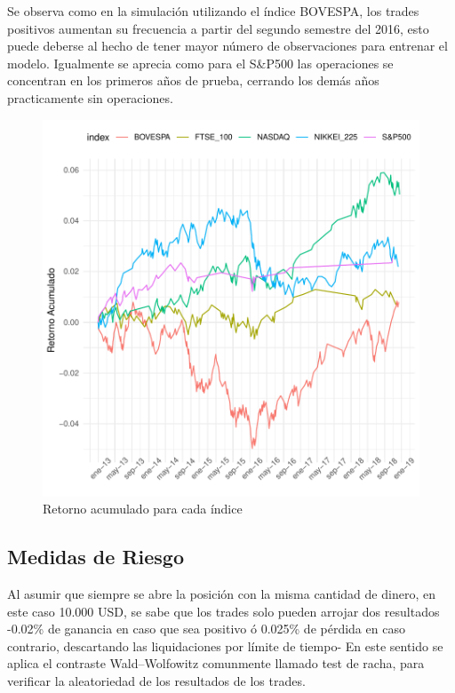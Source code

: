 \documentclass[a4paper,12pt]{Latex/Classes/PhDthesisPSnPDF}
\begin{document}
Se observa como en la simulación utilizando el índice BOVESPA, los trades positivos aumentan su frecuencia a partir del segundo semestre del 2016, esto puede deberse al hecho de tener mayor número de observaciones para entrenar el modelo. Igualmente se aprecia como para el S\&P500 las operaciones se concentran en los primeros años de prueba, cerrando los demás años practicamente sin operaciones.


\begin{figure}[H]
\centering
\includegraphics{main-031}
\caption{Retorno acumulado para cada índice}
\end{figure}

\subsection{Medidas de Riesgo}

Al asumir que siempre se abre la posición con la misma cantidad de dinero, en este caso 10.000 USD, se sabe que los trades solo pueden arrojar dos resultados -0.02\% de ganancia en caso que sea positivo ó 0.025\% de pérdida en caso contrario, descartando las liquidaciones por límite de tiempo- En este sentido se aplica el contraste Wald–Wolfowitz comunmente llamado test de racha, para verificar la aleatoriedad de los resultados de los trades.
\end{document}
